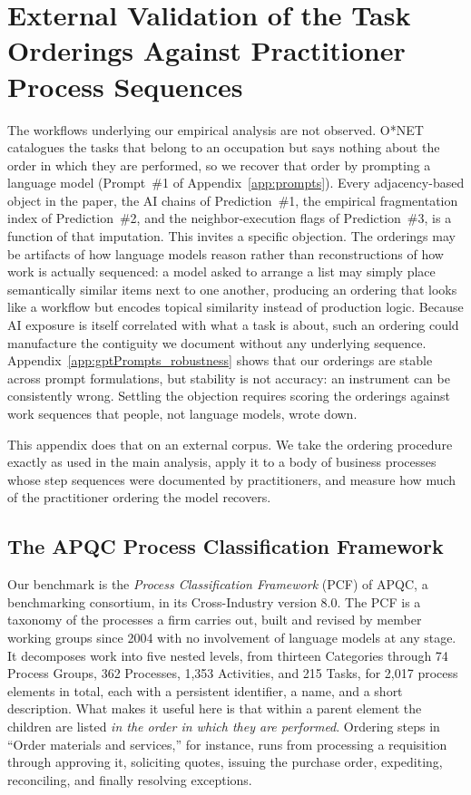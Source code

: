 \section{External Validation of the Task Orderings Against Practitioner Process Sequences}
\label{app:apqc_validation}

The workflows underlying our empirical analysis are not observed.
O*NET catalogues the tasks that belong to an occupation but says nothing about the order in which they are performed, so we recover that order by prompting a language model (Prompt~\#1 of Appendix~\ref{app:prompts}).
Every adjacency-based object in the paper, the AI chains of Prediction~\#1, the empirical fragmentation index of Prediction~\#2, and the neighbor-execution flags of Prediction~\#3, is a function of that imputation.
This invites a specific objection.
The orderings may be artifacts of how language models reason rather than reconstructions of how work is actually sequenced: a model asked to arrange a list may simply place semantically similar items next to one another, producing an ordering that looks like a workflow but encodes topical similarity instead of production logic.
Because AI exposure is itself correlated with what a task is about, such an ordering could manufacture the contiguity we document without any underlying sequence.
Appendix~\ref{app:gptPrompts_robustness} shows that our orderings are stable across prompt formulations, but stability is not accuracy: an instrument can be consistently wrong.
Settling the objection requires scoring the orderings against work sequences that people, not language models, wrote down.

This appendix does that on an external corpus.
We take the ordering procedure exactly as used in the main analysis, apply it to a body of business processes whose step sequences were documented by practitioners, and measure how much of the practitioner ordering the model recovers.

\subsection{The APQC Process Classification Framework}
\label{app:apqc_validation_data}

Our benchmark is the \emph{Process Classification Framework} (PCF) of APQC, a benchmarking consortium, in its Cross-Industry version 8.0.
The PCF is a taxonomy of the processes a firm carries out, built and revised by member working groups since 2004 with no involvement of language models at any stage.
It decomposes work into five nested levels, from thirteen Categories through 74 Process Groups, 362 Processes, 1,353 Activities, and 215 Tasks, for 2,017 process elements in total, each with a persistent identifier, a name, and a short description.
What makes it useful here is that within a parent element the children are listed \emph{in the order in which they are performed}. Ordering steps in ``Order materials and services,'' for instance, runs from processing a requisition through approving it, soliciting quotes, issuing the purchase order, expediting, reconciling, and finally resolving exceptions.

